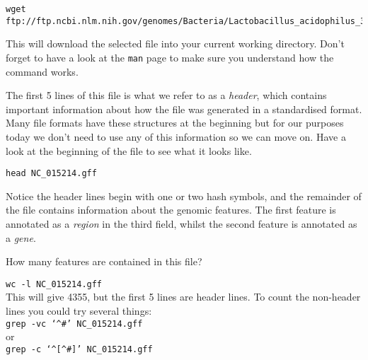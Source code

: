 \begin{lstlisting}[basicstyle=\tiny]
wget ftp://ftp.ncbi.nlm.nih.gov/genomes/Bacteria/Lactobacillus_acidophilus_30SC_uid63605/NC_015214.gff
\end{lstlisting}

This will download the selected file into your current working directory.
Don't forget to have a look at the \texttt{man} page to make sure you understand how the command works.

\begin{steps}
The first 5 lines of this file is what we refer to as a \textit{header}, which contains important information about how the file was generated in a standardised format.
Many file formats have these structures at the beginning but for our purposes today we don't need to use any of this information so we can move on.
Have a look at the beginning of the file to see what it looks like.
\end{steps}
\begin{lstlisting}
head NC_015214.gff
\end{lstlisting}

Notice the header lines begin with one or two hash symbols, and the remainder of the file contains information about the genomic features.
The first feature is annotated as a \textit{region} in the third field, whilst the second feature is annotated as a \textit{gene}.

\begin{questions}
How many features are contained in this file?\\
\begin{answer}
\texttt{wc -l NC\_015214.gff} \\
This will give 4355, but the first 5 lines are header lines.
To count the non-header lines you could try several things:\\
\texttt{grep -vc `\^{}\#' NC\_015214.gff} \\
or\\
\texttt{grep -c `\^{}[\^{}\#]' NC\_015214.gff} \\
\end{answer}

\end{questions}

